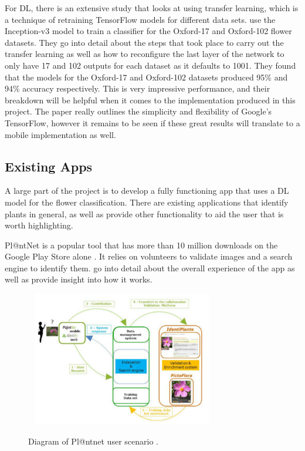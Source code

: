 \documentclass[12pt,a4paper]{report}
\begin{document}
For DL, there is an extensive study that looks at using transfer learning, which is a technique of retraining
TensorFlow models for different data sets. \citet{Xia2017} use the Inception-v3 model to train a classifier for 
the Oxford-17 and Oxford-102 flower datasets. They go into detail about the steps that took place to carry out the 
transfer learning as well as how to reconfigure the last layer of the network to only have 17 and 102 outputs for each 
dataset as it defaults to 1001. They found that the models for the Oxford-17 and Oxford-102 datasets 
produced 95\% and 94\% accuracy respectively. This is very impressive performance, and their breakdown will be helpful 
when it comes to the implementation produced in this project. 
The paper really outlines the simplicity and flexibility of Google's 
TensorFlow, however it remains to be seen if these great results will translate to a mobile implementation 
as well.

\subsection{Existing Apps}

A large part of the project is to develop a fully functioning app that uses a
DL model for the flower classification. There are existing applications that identify plants in general, as well as
provide other functionality to aid the user that is worth highlighting.

\par

Pl@ntNet is a popular tool that has more than 10 million downloads on the Google Play Store alone \citep{googleplay}. 
It relies on volunteers to validate images and a search engine to identify them. \citet{joly:hal-01182775}
go into detail about the overall experience of the app as well as provide insight into how it works.

\begin{figure}[h]\
    \centering
    \includegraphics[width=0.7\textwidth]{plantnet.png}
    \caption{Diagram of Pl@ntnet user scenario \citep{joly:hal-01182775}.}
    \label{fig:plantnet}
\end{figure}
\end{document}
